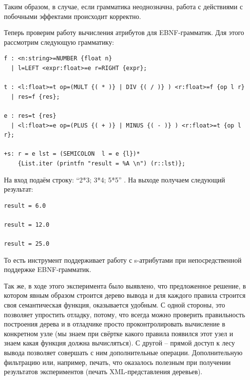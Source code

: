 Таким образом, в случае, если грамматика неоднозначна, работа с действиями с побочными эффектами происходит корректно. 

Теперь проверим работу вычисления атрибутов для EBNF-грамматик. Для этого рассмотрим следующую грамматику:

\begin{verbatim}
f : <n:string>=NUMBER {float n}
  | l=LEFT <expr:float>=e r=RIGHT {expr};  
  
t : <l:float>=t op=(MULT {( * )} | DIV {( / )} ) <r:float>=f {op l r}
  | res=f {res};
  
e : res=t {res}
  | <l:float>=e op=(PLUS {( + )} | MINUS {( - )} ) <r:float>=t {op l r}; 
  
+s: r = e lst = (SEMICOLON  l = e {l})* 
    {List.iter (printfn "result = %A \n") (r::lst)};
\end{verbatim}

На вход подаём строку: "`2*3; 3*4; 5*5"' . На выходе получаем следующий результат:

\begin{verbatim}
result = 6.0

result = 12.0

result = 25.0
\end{verbatim}

То есть инструмент поддерживает работу с s-атрибутами при непосредственной поддержке EBNF-грамматик.

Так же, в ходе этого эксперимента было выявлено, что предложенное решение, в котором явным образом строится дерево вывода и для каждого правила строится своя семантическая функция, оказывается удобным. С одной стороны, это позволяет упростить отладку, потому, что всегда можно проверить правильность построения дерева и в отладчике просто проконтролировать вычисление в конкретном узле (мы знаем при свёртке какого правила появился этот узел и знаем какая функция должна вычисляться). С другой -- прямой доступ к лесу вывода позволяет совершать с ним дополнительные операции.  Дополнительную фильтрацию или, например, печать, что оказалось полезным при получении результатов экспериментов (печать XML-представления деревьев). 
